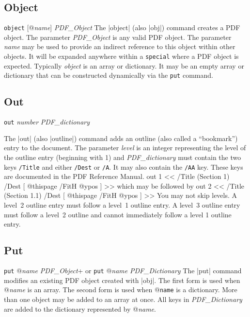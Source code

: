 {\subsection{Object}
\syntax
{\tt object} [@{\it name}] {\it PDF\_Object}
\description
The |object| (also |obj|) command creates a
PDF object.  The parameter {\it PDF\_Object} is any valid PDF object.  The
parameter {\it name} may be used to provide an indirect reference
to this object within other
objects. It will be expanded anywhere within
a {\tt special} where a PDF object is
expected. Typically {\it object} is an array
or dictionary.  It may be an empty array or
dictionary that can be constructed dynamically via
the {\tt put} command.
\example
\begintt
{}
\endtt

\subsection{Out}
\syntax
{\tt out} {\it number} {\it PDF\_dictionary}

\description
The |out| (also |outline|) command adds an outline (also called a ``bookmark'') entry
to the document.
The parameter {\it level\/} is an integer representing the
level of the outline entry (beginning with 1) and
{\it  PDF\_dictionary\/} must contain
the two keys {\tt /Title} and either {\tt /Dest} or {\tt /A}.
It may also contain the {\tt /AA} key.  These keys are documented
in the PDF Reference Manual.
\example
\begintt
out 1 << /Title (Section 1) /Dest [ @thispage /FitH @ypos ] >>
\endtt
which may be followed by
\begintt
out 2 << /Title (Section 1.1) /Dest [ @thispage /FitH @ypos ] >>
\endtt
\note
You may not skip levels.  A level~2 outline entry
must follow a level~1 outline
entry.  A level~3 outline entry must follow a level~2 outline
and cannot immediately follow a level 1 outline entry.

\subsection{Put}
\syntax
\beginlist
{\tt put} @{\it name} {\it PDF\_Object}+
\endlist
or 
\beginlist
{\tt put} @{\it name} {\it PDF\_Dictionary}
\endlist
\description
The |put| command modifies an existing PDF object created with |obj|.
The first form is used when @{\it name} is an array.  The second
form is used when @{\tt name} is a dictionary.  More than
one object may be added to an array at once.
All keys in {\it PDF\_Dictionary}
are added to the dictionary represented by @{\it name}.
\example
\begintt
{}
\endtt

}
